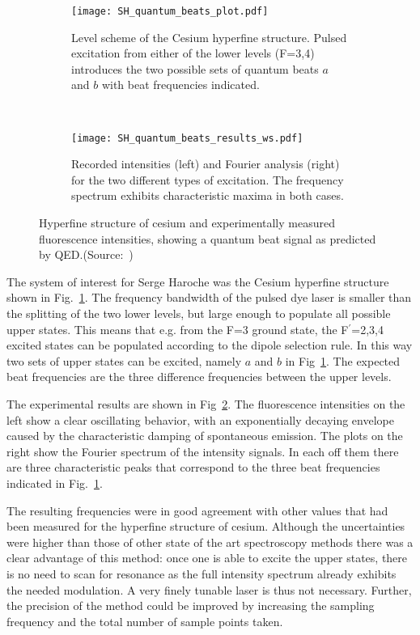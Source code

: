 \begin{figure}[t]
  \centering
  \begin{subfigure}[t]{0.48\linewidth}
    \centering
    \texttt{[image: SH\_quantum\_beats\_plot.pdf]}
    \caption{Level scheme of the Cesium hyperfine structure. Pulsed excitation
    from either of the lower levels (F=3,4) introduces the two possible sets of
  quantum beats $a$ and $b$ with beat frequencies indicated.}
    \label{fig:cs_level_scheme}
  \end{subfigure}
  ~
  \begin{subfigure}[t]{0.48\linewidth}
    \centering
    \texttt{[image: SH\_quantum\_beats\_results\_ws.pdf]}
    \caption{Recorded intensities (left) and Fourier analysis (right) for the
    two different types of excitation. The frequency spectrum exhibits
  characteristic maxima in both cases.}
    \label{fig:cs_beat_results}
  \end{subfigure}
  \caption{Hyperfine structure of cesium and experimentally measured
    fluorescence intensities, showing a
     quantum beat signal as predicted by
  QED.(Source:~\cite{haroche1973hyperfine})}
  \label{fig:quantum_beats_experiment}
\end{figure}

The system of interest for Serge Haroche was the Cesium hyperfine structure
shown in Fig.~\ref{fig:cs_level_scheme}. The frequency bandwidth of the pulsed
dye laser is smaller than the splitting of the two lower levels, but large
enough to populate all possible upper states. This means that e.g. from the F=3
ground state, the F$^\prime$=2,3,4 excited states can be populated according to
the dipole selection rule. In this way two sets of upper states can be excited,
namely $a$ and $b$ in Fig~\ref{fig:cs_level_scheme}. The expected beat
frequencies are the three difference frequencies between the upper levels.

The experimental results are shown in Fig~\ref{fig:cs_beat_results}. The
fluorescence intensities on the left show a clear oscillating behavior, with an
exponentially decaying envelope caused by the characteristic damping of
spontaneous emission. The plots on the right show the Fourier spectrum of the
intensity signals. In each off them there are three characteristic peaks that
correspond to the three beat frequencies indicated in
Fig.~\ref{fig:cs_level_scheme}. 

The resulting frequencies were in good agreement with other values that had been
measured for the hyperfine structure of cesium. Although the uncertainties were
higher than those of other state of the art spectroscopy methods there was a
clear advantage of this method: once one is able to excite the upper states,
there is no need to scan for resonance as the full intensity spectrum already
exhibits the needed modulation. A very finely tunable laser is thus not
necessary. Further, the precision of the method could be improved by increasing
the sampling frequency and the total number of sample points taken.



